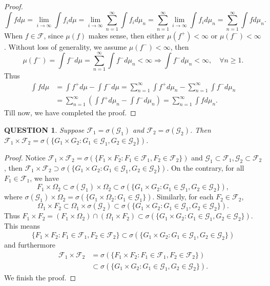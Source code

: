 \documentclass[12pt]{article}
\renewcommand{\(}{\left(}%
\renewcommand{\)}{\right)}%
\renewcommand{\[}{\left[}%
\renewcommand{\]}{\right]}%
\newcommand{\f}{\mathscr{F}}
\newcommand{\g}{\mathscr{G}}
\newtheorem{question}{QUESTION}[section]}
\newtheorem{proof}{Proof.}}
\begin{document}
\begin{proof}
   \begin{equation*}
    \int fd\mu=\lim_{i\to\infty}\int f_id\mu=\lim_{i\to\infty}\sum_{n=1}^\infty\int f_id\mu_n=\sum_{n=1}^\infty\lim_{i\to\infty}\int f_id\mu_n=\sum_{n=1}^\infty\int fd\mu_n.
   \end{equation*}
   When $f\in\f$, since $\mu(f)$ makes sense, then either $\mu(f^+)<\infty$ or $\mu(f^-)<\infty$. Without loss of generality, we assume $\mu(f^-)<\infty$, then
   \begin{equation*}
    \mu(f^-)=\int f^-d\mu=\sum_{n=1}^\infty \int f^-d\mu_n<\infty\Longrightarrow \int f^-d\mu_n<\infty,\quad\!\! \forall n\geq 1.
   \end{equation*}
   Thus
   \begin{equation*}
    \begin{split}
     \int fd\mu&=\int f^+d\mu-\int f^-d\mu=\sum_{n=1}^\infty\int f^+d\mu_n-\sum_{n=1}^\infty\int f^-d\mu_n\\
     &=\sum_{n=1}^\infty\(\int f^+d\mu_n-\int f^-d\mu_n \)=\sum_{n=1}^\infty\int fd\mu_n.
    \end{split}
   \end{equation*}
   Till now, we have completed the proof.
  \end{proof}

  \begin{question}
   Suppose $\f_1=\sigma(\g_1)$ and $\f_2=\sigma(\g_2)$. Then $\f_1\times\f_2=\sigma(\{G_1\times G_2:G_1\in\g_1,G_2\in\g_2 \})$.
  \end{question}
  \begin{proof}
    Notice $\f_1\times\f_2=\sigma(\{F_1\times F_2:F_1\in\f_1,F_2\in\f_2 \})$ and $\g_1\subset\f_1,\g_2\subset\f_2$, then $\f_1\times\f_2\supset \sigma(\{G_1\times G_2:G_1\in\g_1,G_2\in\g_2 \})$. On the contrary, for all $F_1\in\f_1$, we have
    \begin{equation*}
     F_1\times\Omega_2\subset\sigma(\g_1)\times\Omega_2\subset \sigma(\{G_1\times G_2:G_1\in\g_1,G_2\in\g_2 \}),
    \end{equation*}
    where $\sigma(\g_1)\times\Omega_2=\sigma(\{G_1\times \Omega _2:G_1\in\g_1 \})$. Similarly, for each $F_2\in\f_2$,
    \begin{equation*}
     \Omega_1\times F_2\subset\Omega_1\times \sigma(\g_2)\subset \sigma(\{G_1\times G_2:G_1\in\g_1,G_2\in\g_2 \}).
    \end{equation*}
    Thus $F_1\times F_2=(F_1\times\Omega_2)\cap (\Omega_1\times F_2)\subset \sigma(\{G_1\times G_2:G_1\in\g_1,G_2\in\g_2 \})$. This means
    \begin{equation*}
     \{F_1\times F_2:F_1\in\f_1,F_2\in\f_2 \}\subset \sigma(\{G_1\times G_2:G_1\in\g_1,G_2\in\g_2 \})
    \end{equation*}
    and furthermore
    \begin{equation*}
     \begin{split}
      \f_1\times\f_2&=\sigma(\{F_1\times F_2:F_1\in\f_1,F_2\in\f_2 \})\\
      &\subset \sigma(\{G_1\times G_2:G_1\in\g_1,G_2\in\g_2 \}).
     \end{split}
    \end{equation*}
    We finish the proof.
  \end{proof}
\end{document}
